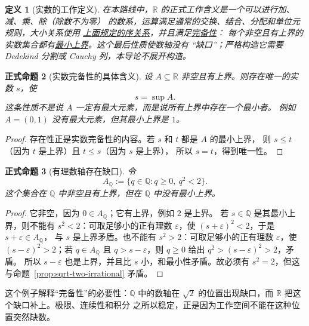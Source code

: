 \documentclass[UTF8,fontset=none,a4paper,11pt]{ctexart}
\theoremstyle{foundation-definition}
\newtheorem{definition}{定义}[section]
\theoremstyle{foundation-theorem}
\theoremstyle{foundation-proposition}
\newtheorem{proposition}[definition]{正式命题}
\theoremstyle{foundation-example}
\theoremstyle{foundation-remark}
\theoremstyle{foundation-theorem}
\newcommand{\term}[2]{\hyperref[#1]{#2}}
\begin{document}
\begin{definition}[实数的工作定义]\label{def:real-number}\label{def:real-completeness}
在本路线中，\(\mathbb R\) 的正式工作含义是一个可以进行加、减、乘、除（除数不为零）
的数系，运算满足通常的交换、结合、分配和单位元规则，大小关系使用
\term{def:ordered-relation}{上面规定的序关系}，并且满足\term{def:real-completeness}{完备性}：
每个非空且有上界的实数集合都有\term{def:supremum}{最小上界}。这个最后性质使数轴没有
“缺口”；严格构造它需要 Dedekind 分割或 Cauchy 列，本导论不展开构造。
\end{definition}

\begin{proposition}[实数完备性的具体含义]\label{prop:real-completeness-concrete}
设 \(A\subseteq\mathbb R\) 非空且有上界。则存在唯一的实数 \(s\)，使
\[
s=\sup A.
\]
这条性质不是说 \(A\) 一定有最大元素，而是说所有上界中存在一个最小者。
例如 \(A=(0,1)\) 没有最大元素，但其最小上界是 \(1\)。
\end{proposition}

\begin{proof}
存在性正是实数完备性的内容。若 \(s\) 和 \(t\) 都是 \(A\) 的最小上界，
则 \(s\le t\)（因为 \(t\) 是上界）且 \(t\le s\)（因为 \(s\) 是上界），
所以 \(s=t\)，得到唯一性。
\end{proof}

\begin{proposition}[有理数轴存在缺口]\label{prop:rational-incompleteness}
令
\[
A_{\mathbb Q}:=\{q\in\mathbb Q:q\ge0,\ q^2<2\}.
\]
这个集合在 \(\mathbb Q\) 中非空且有上界，但在 \(\mathbb Q\) 中没有最小上界。
\end{proposition}

\begin{proof}
它非空，因为 \(0\in A_{\mathbb Q}\)；它有上界，例如 \(2\) 是上界。
若 \(s\in\mathbb Q\) 是其最小上界，则不能有 \(s^2<2\)：可取足够小的正有理数
\(\varepsilon\)，使 \((s+\varepsilon)^2<2\)，于是 \(s+\varepsilon\in A_{\mathbb Q}\)，
与 \(s\) 是上界矛盾。也不能有 \(s^2>2\)：可取足够小的正有理数
\(\varepsilon\)，使 \((s-\varepsilon)^2>2\)；若 \(q\in A_{\mathbb Q}\) 且
\(q>s-\varepsilon\)，则 \(q\ge0\) 给出 \(q^2>(s-\varepsilon)^2>2\)，矛盾。
所以 \(s-\varepsilon\) 也是上界，并且比 \(s\) 小，和最小性矛盾。故必须有
\(s^2=2\)，但这与命题~\ref{prop:sqrt-two-irrational} 矛盾。
\end{proof}

这个例子解释“完备性”的必要性：\(\mathbb Q\) 中的数轴在
\(\sqrt2\) 的位置出现缺口，而 \(\mathbb R\) 把这个缺口补上。极限、连续性和积分
之所以稳定，正是因为工作空间不能在这种位置突然缺数。
\end{document}
